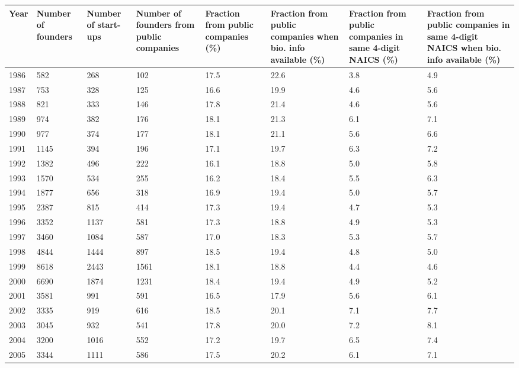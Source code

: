 \begin{table}[!htb]
\centering
\begingroup\scriptsize
\begin{tabular}{p{1.75cm}p{1.75cm}p{1.75cm}p{1.75cm}p{1.75cm}p{1.75cm}p{1.75cm}p{1.75cm}}
  \toprule
Year & Number of founders & Number of start-ups & Number of founders from public companies & Fraction from public companies (\%) & Fraction from public companies when bio. info available (\%) & Fraction from public companies in same 4-digit NAICS (\%) & Fraction from public companies in same 4-digit NAICS when bio. info available (\%) \\ 
  \midrule
1986 & 582 & 268 & 102 & 17.5 & 22.6 & 3.8 & 4.9 \\ 
  1987 & 753 & 328 & 125 & 16.6 & 19.9 & 4.6 & 5.6 \\ 
  1988 & 821 & 333 & 146 & 17.8 & 21.4 & 4.6 & 5.6 \\ 
  1989 & 974 & 382 & 176 & 18.1 & 21.3 & 6.1 & 7.1 \\ 
  1990 & 977 & 374 & 177 & 18.1 & 21.1 & 5.6 & 6.6 \\ 
  1991 & 1145 & 394 & 196 & 17.1 & 19.7 & 6.3 & 7.2 \\ 
  1992 & 1382 & 496 & 222 & 16.1 & 18.8 & 5.0 & 5.8 \\ 
  1993 & 1570 & 534 & 255 & 16.2 & 18.4 & 5.5 & 6.3 \\ 
  1994 & 1877 & 656 & 318 & 16.9 & 19.4 & 5.0 & 5.7 \\ 
  1995 & 2387 & 815 & 414 & 17.3 & 19.4 & 4.7 & 5.3 \\ 
  1996 & 3352 & 1137 & 581 & 17.3 & 18.8 & 4.9 & 5.3 \\ 
  1997 & 3460 & 1084 & 587 & 17.0 & 18.3 & 5.3 & 5.7 \\ 
  1998 & 4844 & 1444 & 897 & 18.5 & 19.4 & 4.8 & 5.0 \\ 
  1999 & 8618 & 2443 & 1561 & 18.1 & 18.8 & 4.4 & 4.6 \\ 
  2000 & 6690 & 1874 & 1231 & 18.4 & 19.4 & 4.9 & 5.2 \\ 
  2001 & 3581 & 991 & 591 & 16.5 & 17.9 & 5.6 & 6.1 \\ 
  2002 & 3335 & 919 & 616 & 18.5 & 20.1 & 7.1 & 7.7 \\ 
  2003 & 3045 & 932 & 541 & 17.8 & 20.0 & 7.2 & 8.1 \\ 
  2004 & 3200 & 1016 & 552 & 17.2 & 19.7 & 6.5 & 7.4 \\ 
  2005 & 3344 & 1111 & 586 & 17.5 & 20.2 & 6.1 & 7.1 \\ 

\end{tabular}
\end{table}
